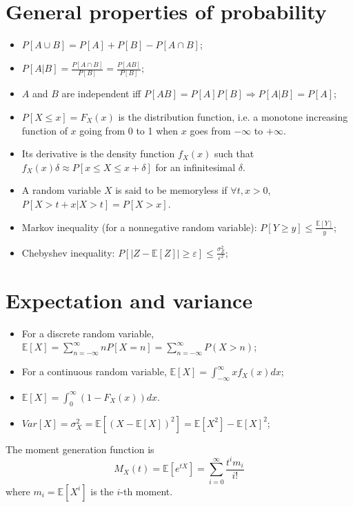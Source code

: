 \documentclass[12pt, openany]{report}
\newcommand{\E}{\mathbb{E}}
\theoremstyle{definition}
\begin{document}
\section{General properties of probability}
\begin{itemize}
  \item $P[A\cup B]=P[A]+P[B]-P[A\cap B]$;
  \item $P[A|B] = \frac{P[A\cap B]}{P[B]} = \frac{P[AB]}{P[B]}$;
  \item $A$ and $B$ are independent iff $P[AB]=P[A]P[B]\Longrightarrow P[A|B]=P[A]$;
  \item $P[X\le x]=F_X(x)$ is the distribution function, i.e. a monotone increasing function of $x$ going from 0 to 1 when $x$ goes from $-\infty$ to $+\infty$.
  \item Its derivative is the density function $f_X(x)$ such that $f_X(x)\delta \approx P[x\le X\le x+\delta]$ for an infinitesimal $\delta$.
  \item A random variable $X$ is said to be memoryless if $\forall t,x>0$, $P[X>t+x|X>t]=P[X>x]$.
  \item Markov inequality (for a nonnegative random variable): $P[Y\ge y] \le \frac{\E[Y]}{y}$;
  \item Chebyshev inequality: $P[|Z-\E[Z]| \ge \varepsilon] \le \frac{\sigma_Z^2}{\varepsilon^2}$;
\end{itemize}
\section{Expectation and variance}
\begin{itemize}
  \item For a discrete random variable, $\E[X]= \sum_{n=-\infty}^\infty nP[X=n]=\sum_{n=-\infty}^\infty P(X>n)$;
  \item For a continuous random variable, $\E[X]=\int_{-\infty}^\infty xf_X(x)dx$;
  \item $\E[X] = \int_0^\infty (1-F_X(x))dx$.
  \item $Var[X] = \sigma_X^2 = \E[(X-\E[X])^2] = \E[X^2] - \E[X]^2$;
\end{itemize}
The moment generation function is 
\begin{equation}
	M_X(t) = \mathbb{E}[e^{tX}] = \sum_{i=0}^\infty \frac{t^im_i}{i!}
\end{equation}
where $m_i=\mathbb{E}[X^i]$ is the $i$-th moment.
\end{document}

